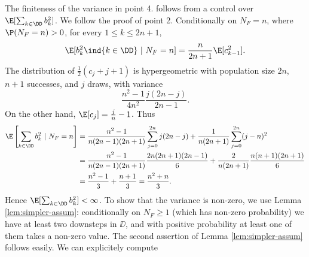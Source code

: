 \documentclass[10pt,a4paper]{article}
\begin{document}
The finiteness of the variance in point 4. follows from a control over $\E[\sum_{k\in\DD} b_k^2]$. We follow the proof of point 2. Conditionally on $N_F = n$, where $\P(N_F=n)>0$, for every $1\leq k \leq 2n+1$, 
\[ \E[b_k^2 \ind{k\in\DD} \ | \ N_F=n] = \frac{n}{2n+1} \E[c_{k-1}^2] . \]
The distribution of $\frac 12 (c_j+j+1)$ is hypergeometric with population size $2n$, $n+1$ successes, and $j$ draws, with variance
\[ \frac{n^2-1}{4n^2}\frac{j(2n-j)}{2n-1} . \]
On the other hand, $\E[c_j] = \frac{j}{n}-1$. Thus
\begin{align*}
\E\left[\sum_{k\in\DD} b_k^2 \ | \ N_F=n\right] &= \frac{n^2-1}{n(2n-1)(2n+1)} \sum_{j=0}^{2n} j(2n-j) + \frac{1}{n(2n+1)} \sum_{j=0}^{2n} (j-n)^2  \\
&= \frac{n^2-1}{n(2n-1)(2n+1)} \frac{2n(2n+1)(2n-1)}{6} + \frac{2}{n(2n+1)} \frac{n(n+1)(2n+1)}{6}  \\
&= \frac{n^2-1}{3} + \frac{n+1}{3} = \frac{n^2 + n}{3} .
\end{align*}
Hence
$ \E[ \sum_{k\in\DD} b_k^2 ] < \infty$. %
To show that the variance is non-zero, we use Lemma \ref{lem:simpler-assum}: conditionally on $N_F\geq 1$ (which has non-zero probability) we have at least two downsteps in $\DD$, and with positive probability at least one of them takes a non-zero value. The second assertion of Lemma \ref{lem:simpler-assum} follows easily. We can explicitely compute
\end{document}
